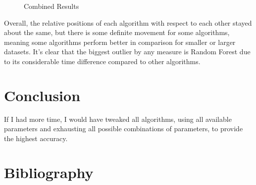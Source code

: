 \documentclass{article}
\begin{document}
\begin{figure}[H]
	\caption{Combined Results}
\end{figure}

Overall, the relative positions of each algorithm with respect to each other stayed about the same, but there is some definite movement for some algorithms, meaning some algorithms perform better in comparison for smaller or larger datasets.
It's clear that the biggest outlier by any measure is Random Forest due to its considerable time difference compared to other algorithms.

\section{Conclusion}

If I had more time, I would have tweaked all algorithms, using all available parameters and exhausting all possible combinations of parameters, to provide the highest accuracy.

\section{Bibliography}

\printbibliography
\end{document}
